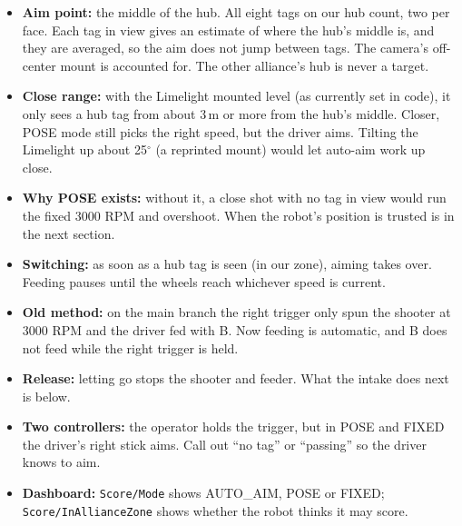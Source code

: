 \documentclass[11pt]{article}
\newcommand{\dash}[1]{\texttt{#1}}
\begin{document}
\begin{itemize}
  \item \textbf{Aim point:} the middle of the hub. All eight tags on our hub count, two per face.
    Each tag in view gives an estimate of where the hub's middle is, and they are averaged, so the
    aim does not jump between tags. The camera's off-center mount is accounted for. The other
    alliance's hub is never a target.
  \item \textbf{Close range:} with the Limelight mounted level (as currently set in code), it only
    sees a hub tag from about 3\,m or more from the hub's middle. Closer, POSE mode still picks the
    right speed, but the driver aims. Tilting the Limelight up about 25$^\circ$ (a reprinted mount)
    would let auto-aim work up close.
  \item \textbf{Why POSE exists:} without it, a close shot with no tag in view would run the fixed
    3000 RPM and overshoot. When the robot's position is trusted is in the next section.
  \item \textbf{Switching:} as soon as a hub tag is seen (in our zone), aiming takes over. Feeding
    pauses until the wheels reach whichever speed is current.
  \item \textbf{Old method:} on the main branch the right trigger only spun the shooter at 3000 RPM
    and the driver fed with B. Now feeding is automatic, and B does not feed while the right
    trigger is held.
  \item \textbf{Release:} letting go stops the shooter and feeder. What the intake does next is
    below.
  \item \textbf{Two controllers:} the operator holds the trigger, but in POSE and FIXED the
    driver's right stick aims. Call out ``no tag'' or ``passing'' so the driver knows to aim.
  \item \textbf{Dashboard:} \dash{Score/Mode} shows AUTO\_AIM, POSE or FIXED;
    \dash{Score/InAllianceZone} shows whether the robot thinks it may score.
\end{itemize}
\end{document}
